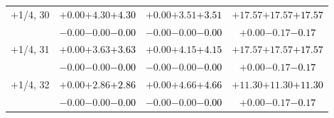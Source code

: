 \documentclass[compress]{beamer}
\begin{document}
\begin{frame}
\begin{tabular}{r | c | c | c}
$+$1/4, 30 & $+0.00$\hspace{0.1 cm}$+4.30$\hspace{0.1 cm}\textcolor{black}{$+4.30$} & $+0.00$\hspace{0.1 cm}$+3.51$\hspace{0.1 cm}\textcolor{black}{$+3.51$} & $+17.57$\hspace{0.1 cm}$+17.57$\hspace{0.1 cm}\textcolor{black}{$+17.57$} \\
           & $-0.00$\hspace{0.1 cm}$-0.00$\hspace{0.1 cm}\textcolor{black}{$-0.00$} & $-0.00$\hspace{0.1 cm}$-0.00$\hspace{0.1 cm}\textcolor{black}{$-0.00$} & $+0.00$\hspace{0.1 cm}$-0.17$\hspace{0.1 cm}\textcolor{black}{$-0.17$} \\
$+$1/4, 31 & $+0.00$\hspace{0.1 cm}$+3.63$\hspace{0.1 cm}\textcolor{black}{$+3.63$} & $+0.00$\hspace{0.1 cm}$+4.15$\hspace{0.1 cm}\textcolor{black}{$+4.15$} & $+17.57$\hspace{0.1 cm}$+17.57$\hspace{0.1 cm}\textcolor{black}{$+17.57$} \\
           & $-0.00$\hspace{0.1 cm}$-0.00$\hspace{0.1 cm}\textcolor{black}{$-0.00$} & $-0.00$\hspace{0.1 cm}$-0.00$\hspace{0.1 cm}\textcolor{black}{$-0.00$} & $+0.00$\hspace{0.1 cm}$-0.17$\hspace{0.1 cm}\textcolor{black}{$-0.17$} \\
$+$1/4, 32 & $+0.00$\hspace{0.1 cm}$+2.86$\hspace{0.1 cm}\textcolor{black}{$+2.86$} & $+0.00$\hspace{0.1 cm}$+4.66$\hspace{0.1 cm}\textcolor{black}{$+4.66$} & $+11.30$\hspace{0.1 cm}$+11.30$\hspace{0.1 cm}\textcolor{black}{$+11.30$} \\
           & $-0.00$\hspace{0.1 cm}$-0.00$\hspace{0.1 cm}\textcolor{black}{$-0.00$} & $-0.00$\hspace{0.1 cm}$-0.00$\hspace{0.1 cm}\textcolor{black}{$-0.00$} & $+0.00$\hspace{0.1 cm}$-0.17$\hspace{0.1 cm}\textcolor{black}{$-0.17$} \\

\end{tabular}
\end{frame}
\end{document}
